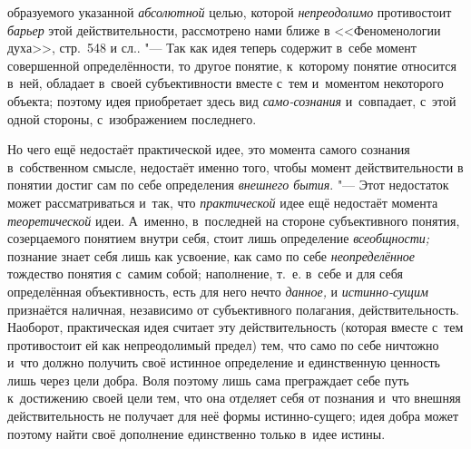 образуемого указанной {\em абсолютной}
целью, которой
{\em непреодолимо}
противостоит {\em барьер}
этой действительности, рассмотрено нами ближе в
<<Феноменологии духа>>, стр.~548 и
сл..
"--- Так как идея теперь содержит в~себе момент совершенной
определённости, то другое понятие, к~которому понятие относится в~ней,
обладает в~своей субъективности вместе с~тем и~моментом некоторого объекта;
поэтому идея приобретает здесь вид
{\em само-сознания}
и~совпадает, с~этой одной стороны, с~изображением
последнего.

Но чего ещё недостаёт практической идее, это момента самого
сознания в~собственном
смысле,
недостаёт именно того, чтобы момент действительности в
понятии достиг сам по себе определения
{\em внешнего бытия}. "---
Этот недостаток может рассматриваться и~так, что
{\em практической} идее
ещё недостаёт момента
{\em теоретической} идеи.
А~именно, в~последней на стороне субъективного понятия, созерцаемого
понятием внутри себя, стоит лишь определение
{\em всеобщности;}
познание знает себя лишь как усвоение, как само по себе
{\em неопределённое}
тождество понятия с~самим собой; наполнение, т.~е. в~себе и
для себя определённая объективность, есть для него нечто
{\em данное,} и
{\em истинно-сущим}
признаётся наличная, независимо от субъективного полагания,
действительность. Наоборот, практическая идея считает эту действительность
(которая вместе с~тем противостоит ей как непреодолимый предел) тем, что
само по себе ничтожно и~что должно получить своё истинное определение и
единственную ценность лишь через цели добра. Воля поэтому лишь сама
преграждает себе путь к~достижению своей цели тем, что она отделяет себя от
познания и~что внешняя действительность не получает для неё формы
истинно-сущего; идея добра может поэтому найти своё дополнение единственно
только в~идее истины.

